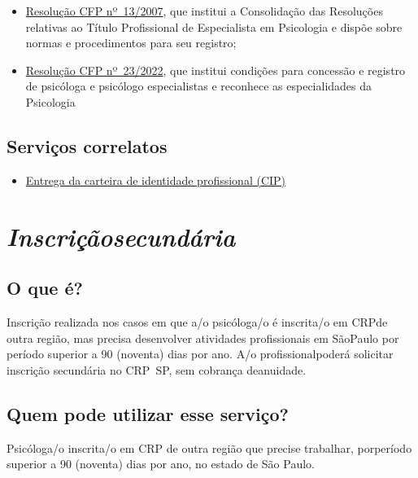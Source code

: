\begin{itemize}
  \item  \href{https://site.cfp.org.br/wp-content/uploads/2008/08/Resolucao_CFP_nx_013-2007.pdf}{Resolução  CFP nº~13/2007}, que institui a Consolidação das Resoluções relativas  ao Título Profissional de Especialista em Psicologia e dispõe sobre  normas e procedimentos para seu registro;
  \item  \href{https://atosoficiais.com.br/cfp/resolucao-do-exercicio-profissional-n-23-2022-institui-condicoes-para-concessao-e-registro-de-psicologa-e-psicologo-especialistas-reconhece-as-especialidades-da-psicologia-e-revoga-as-resolucoes-cfp-n-13-de-14-de-setembro-de-2007-n-3-de-5-de-fevereiro-de-2016-n-18-de-5-de-setembro-de-2019}{Resolução  CFP nº~23/2022}, que institui condições para concessão e registro de  psicóloga e psicólogo especialistas e reconhece as especialidades da  Psicologia
\end{itemize}

\section{Serviços correlatos}

\begin{itemize}
  \item  \hyperref[]{Entrega  da carteira de identidade profissional (CIP)}
\end{itemize}

\chapter{\texorpdfstring{\emph{Inscriçãosecundária}}{Inscrição secundária}}


\section{O que é?}

Inscrição realizada nos casos em que a/o psicóloga/o é inscrita/o em CRPde outra região, mas precisa desenvolver atividades profissionais em SãoPaulo por período superior a 90 (noventa) dias por ano. A/o profissionalpoderá solicitar inscrição secundária no CRP~SP, sem cobrança deanuidade.

\section{Quem pode utilizar esse serviço?}

Psicóloga/o inscrita/o em CRP de outra região que precise trabalhar, porperíodo superior a 90 (noventa) dias por ano, no estado de São Paulo.


